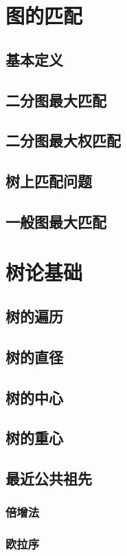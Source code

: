 \documentclass[12pt,a4paper]{article}
\begin{document}
\newpage
\section{图的匹配}
\subsection{基本定义}
\subsection{二分图最大匹配}
\subsection{二分图最大权匹配}
\subsection{树上匹配问题}
\subsection{一般图最大匹配}

\newpage
\section{树论基础}
\subsection{树的遍历}
\subsection{树的直径}
\subsection{树的中心}
\subsection{树的重心}
\subsection{最近公共祖先}
\subsubsection{倍增法}
\subsubsection{欧拉序}
\end{document}
